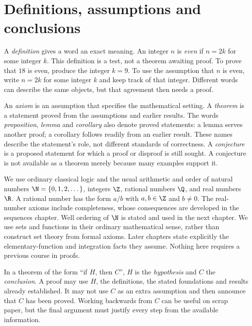 \section{Definitions, assumptions and conclusions}

A \emph{definition} gives a word an exact meaning. An integer $n$ is \emph{even} if
$n=2k$ for some integer $k$. This definition is a test, not a theorem awaiting proof.
To prove that $18$ is even, produce the integer $k=9$. To use the assumption that
$n$ is even, write $n=2k$ for some integer $k$ and keep track of that integer.
Different words can describe the same objects, but that agreement then needs a proof.

An \emph{axiom} is an assumption that specifies the mathematical setting. A
\emph{theorem} is a statement proved from the assumptions and earlier results.
The words \emph{proposition}, \emph{lemma} and \emph{corollary} also denote proved statements:
a lemma serves another proof; a corollary follows readily from an earlier result.
These names describe the statement's role, not different standards of correctness.
A \emph{conjecture} is a proposed statement for which a proof or disproof is still sought.
A conjecture is not available as a theorem merely because many examples support it.

\begin{reminder}
We use ordinary classical logic and the usual arithmetic and order of natural numbers
$\N=\{0,1,2,\dots\}$, integers $\Z$, rational numbers $\Q$, and real numbers $\R$.
A rational number has the form $a/b$ with $a,b\in\Z$ and $b\ne0$.
The real-number axioms include completeness, whose consequences are developed in the
sequences chapter. Well ordering of $\N$ is stated and used in the next chapter.
We use sets and functions in their ordinary mathematical sense, rather than construct
set theory from formal axioms. Later chapters state explicitly the elementary-function
and integration facts they assume. Nothing here requires a previous course in proofs.
\end{reminder}

In a theorem of the form ``if $H$, then $C$'', $H$ is the \emph{hypothesis} and $C$ the
\emph{conclusion}. A proof may use $H$, the definitions, the stated foundations and results
already established. It may not use $C$ as an extra assumption and then announce that $C$
has been proved. Working backwards from $C$ can be useful on scrap paper, but the final
argument must justify every step from the available information.

